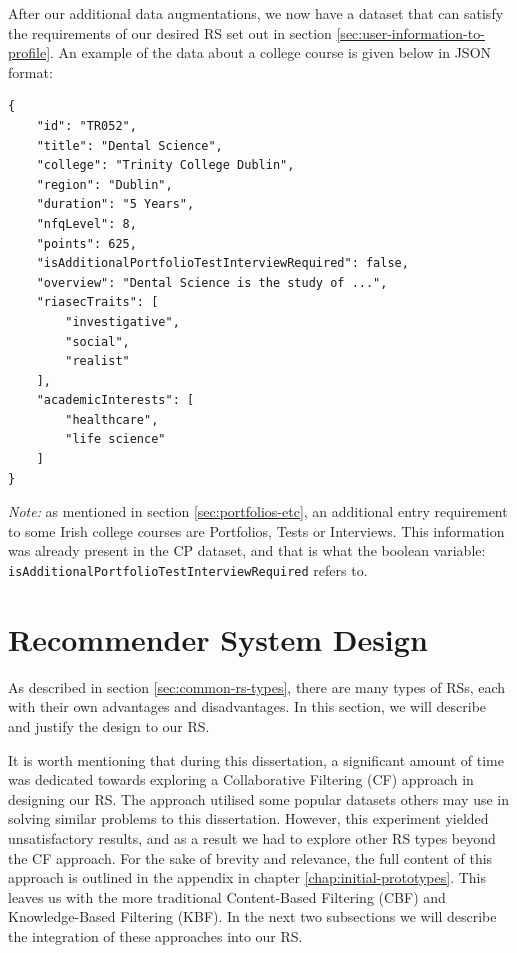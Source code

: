 After our additional data augmentations, we now have a dataset that can satisfy the requirements of our desired RS  
set out in section \ref{sec:user-information-to-profile}.
An example of the data about a college course is given below in JSON format:

\newpage

\begin{lstlisting}[caption={An example of a college course in the CP dataset after additional augmentation.}, label={lst:dataset-before-augmentation}]
{
    "id": "TR052",
    "title": "Dental Science",
    "college": "Trinity College Dublin",
    "region": "Dublin",
    "duration": "5 Years",
    "nfqLevel": 8,
    "points": 625,
    "isAdditionalPortfolioTestInterviewRequired": false,
    "overview": "Dental Science is the study of ...",
    "riasecTraits": [
        "investigative",
        "social",
        "realist"
    ],
    "academicInterests": [
        "healthcare",
        "life science"
    ]
}
\end{lstlisting}

\emph{Note:} as mentioned in section \ref{sec:portfolios-etc},
an additional entry requirement to some Irish college courses are Portfolios, Tests or Interviews.
This information was already present in the CP dataset, and that is what 
the boolean variable: \\
\verb|isAdditionalPortfolioTestInterviewRequired|
refers to.

\section{Recommender System Design}
\label{sec:rs-design}

As described in section \ref{sec:common-rs-types}, there are many types of RSs,
each with their own advantages and disadvantages. 
In this section, we will describe and justify the design to our RS.

It is worth mentioning that during this dissertation,
a significant amount of time was dedicated towards exploring a Collaborative Filtering (CF) approach 
in designing our RS. 
The approach utilised some popular datasets others may use in solving similar problems to this dissertation.
However, this experiment yielded unsatisfactory results, and as a result we had to explore other RS types beyond 
the CF approach.
For the sake of brevity and relevance, the full content of this approach is outlined in the appendix in chapter \ref{chap:initial-prototypes}.
This leaves us with the more traditional Content-Based Filtering (CBF) and Knowledge-Based Filtering (KBF).
In the next two subsections we will describe the integration of these approaches into our RS.

